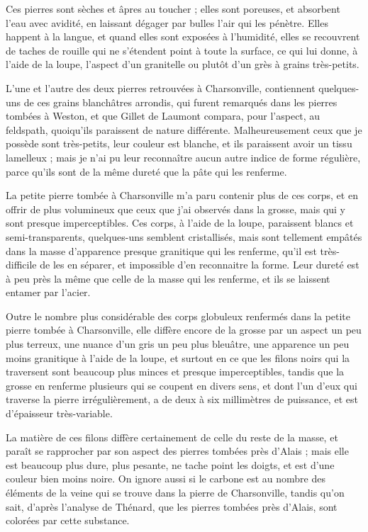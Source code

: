 \documentclass[a4paper, 12pt, oneside, french]{article}
\begin{document}
Ces pierres sont sèches et âpres au toucher ; elles sont poreuses, et absorbent l'eau avec avidité, en laissant dégager par bulles l'air qui les pénètre. Elles happent à la langue, et quand elles sont exposées à l'humidité, elles se recouvrent de taches de rouille qui ne s'étendent point à toute la surface, ce qui lui donne, à l'aide de la loupe, l'aspect d'un granitelle ou plutôt d'un grès à grains très-petits.

L'une et l'autre des deux pierres retrouvées à Charsonville, contiennent quelques-uns de ces grains blanchâtres arrondis, qui furent remarqués dans les pierres tombées à Weston, et que Gillet de Laumont compara, pour l'aspect, au feldspath, quoiqu'ils paraissent de nature différente. Malheureusement ceux que je possède sont très-petits, leur couleur est blanche, et ils paraissent avoir un tissu lamelleux ; mais je n'ai pu leur reconnaître aucun autre indice de forme régulière, parce qu'ils sont de la même dureté que la pâte qui les renferme.

La petite pierre tombée à Charsonville m'a paru contenir plus de ces corps, et en offrir de plus volumineux que ceux que j'ai observés dans la grosse, mais qui y sont presque imperceptibles. Ces corps, à l'aide de la loupe, paraissent blancs et semi-transparents, quelques-uns semblent cristallisés, mais sont tellement empâtés dans la masse d'apparence presque granitique qui les renferme, qu'il est très-difficile de les en séparer, et impossible d'en reconnaitre la forme. Leur dureté est à peu près la même que celle de la masse qui les renferme, et ils se laissent entamer par l'acier.

Outre le nombre plus considérable des corps globuleux renfermés dans la petite pierre tombée à Charsonville, elle diffère encore de la grosse par un aspect un peu plus terreux, une nuance d'un gris un peu plus bleuâtre, une apparence un peu moins granitique à l'aide de la loupe, et surtout en ce que les filons noirs qui la traversent sont beaucoup plus minces et presque imperceptibles, tandis que la grosse en renferme plusieurs qui se coupent en divers sens, et dont l'un d'eux qui traverse la pierre irrégulièrement, a de deux à six millimètres de puissance, et est d'épaisseur très-variable.

La matière de ces filons diffère certainement de celle du reste de la masse, et paraît se rapprocher par son aspect des pierres tombées près d'Alais ; mais elle est beaucoup plus dure, plus pesante, ne tache point les doigts, et est d'une couleur bien moins noire. On ignore aussi si le carbone est au nombre des éléments de la veine qui se trouve dans la pierre de Charsonville, tandis qu'on sait, d'après l'analyse de Thénard, que les pierres tombées près d'Alais, sont colorées par cette substance.
\end{document}
